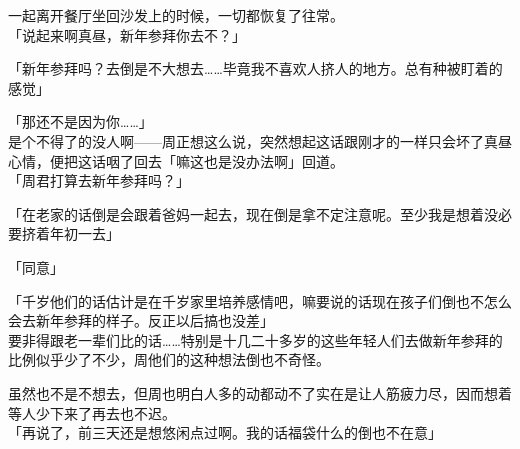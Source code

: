 一起离开餐厅坐回沙发上的时候，一切都恢复了往常。\\

「说起来啊真昼，新年参拜你去不？」

「新年参拜吗？去倒是不大想去……毕竟我不喜欢人挤人的地方。总有种被盯着的感觉」

「那还不是因为你……」\\

是个不得了的没人啊——周正想这么说，突然想起这话跟刚才的一样只会坏了真昼心情，便把这话咽了回去「嘛这也是没办法啊」回道。\\

「周君打算去新年参拜吗？」

「在老家的话倒是会跟着爸妈一起去，现在倒是拿不定注意呢。至少我是想着没必要挤着年初一去」

「同意」

「千岁他们的话估计是在千岁家里培养感情吧，嘛要说的话现在孩子们倒也不怎么会去新年参拜的样子。反正以后搞也没差」\\

要非得跟老一辈们比的话……特别是十几二十多岁的这些年轻人们去做新年参拜的比例似乎少了不少，周他们的这种想法倒也不奇怪。

虽然也不是不想去，但周也明白人多的动都动不了实在是让人筋疲力尽，因而想着等人少下来了再去也不迟。\\

「再说了，前三天还是想悠闲点过啊。我的话福袋什么的倒也不在意」

